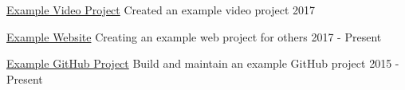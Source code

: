 
\begin{cvprojects}

  \cvproject
    {\href{https://youtube.com}{Example Video Project}} %
    {Created an example video project} %
    {2017} %

  \cvproject
    {\href{http://example.com}{Example Website}} %
    {Creating an example web project for others} %
    {2017 - Present} %

  \cvproject
    {\href{https://github.com}{Example GitHub Project}} %
    {Build and maintain an example GitHub project} %
    {2015 - Present} %

\end{cvprojects}
